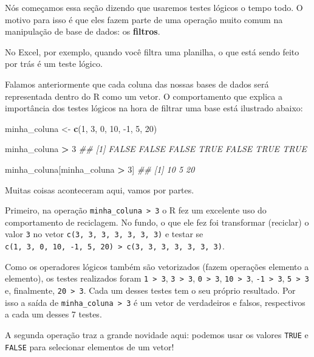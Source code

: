 \documentclass[]{book}
\newenvironment{Shaded}{\begin{snugshade}}{\end{snugshade}}
\newcommand{\CommentTok}[1]{\textcolor[rgb]{0.56,0.35,0.01}{\textit{#1}}}
\newcommand{\DecValTok}[1]{\textcolor[rgb]{0.00,0.00,0.81}{#1}}
\newcommand{\KeywordTok}[1]{\textcolor[rgb]{0.13,0.29,0.53}{\textbf{#1}}}
\newcommand{\NormalTok}[1]{#1}
\newcommand{\OperatorTok}[1]{\textcolor[rgb]{0.81,0.36,0.00}{\textbf{#1}}}
\newcommand{\StringTok}[1]{\textcolor[rgb]{0.31,0.60,0.02}{#1}}
\begin{document}
Nós começamos essa seção dizendo que usaremos testes lógicos o tempo todo. O motivo para isso é que eles fazem parte de uma operação muito comum na manipulação de base de dados: os \textbf{filtros}.

No Excel, por exemplo, quando você filtra uma planilha, o que está sendo feito por trás é um teste lógico.

Falamos anteriormente que cada coluna das nossas bases de dados será representada dentro do R como um vetor. O comportamento que explica a importância dos testes lógicos na hora de filtrar uma base está ilustrado abaixo:

\begin{Shaded}
\begin{Highlighting}[]
\NormalTok{minha_coluna <-}\StringTok{ }\KeywordTok{c}\NormalTok{(}\DecValTok{1}\NormalTok{, }\DecValTok{3}\NormalTok{, }\DecValTok{0}\NormalTok{, }\DecValTok{10}\NormalTok{, }\DecValTok{-1}\NormalTok{, }\DecValTok{5}\NormalTok{, }\DecValTok{20}\NormalTok{)}

\NormalTok{minha_coluna }\OperatorTok{>}\StringTok{ }\DecValTok{3}
\CommentTok{## [1] FALSE FALSE FALSE  TRUE FALSE  TRUE  TRUE}

\NormalTok{minha_coluna[minha_coluna }\OperatorTok{>}\StringTok{ }\DecValTok{3}\NormalTok{]}
\CommentTok{## [1] 10  5 20}
\end{Highlighting}
\end{Shaded}

Muitas coisas aconteceram aqui, vamos por partes.

Primeiro, na operação \texttt{minha\_coluna\ \textgreater{}\ 3} o R fez um excelente uso do comportamento de reciclagem. No fundo, o que ele fez foi transformar (reciclar) o valor \texttt{3} no vetor \texttt{c(3,\ 3,\ 3,\ 3,\ 3,\ 3,\ 3)} e testar se \texttt{c(1,\ 3,\ 0,\ 10,\ -1,\ 5,\ 20)\ \textgreater{}\ c(3,\ 3,\ 3,\ 3,\ 3,\ 3,\ 3)}.

Como os operadores lógicos também são vetorizados (fazem operações elemento a elemento), os testes realizados foram \texttt{1\ \textgreater{}\ 3}, \texttt{3\ \textgreater{}\ 3}, \texttt{0\ \textgreater{}\ 3}, \texttt{10\ \textgreater{}\ 3}, \texttt{-1\ \textgreater{}\ 3}, \texttt{5\ \textgreater{}\ 3} e, finalmente, \texttt{20\ \textgreater{}\ 3}. Cada um desses testes tem o seu próprio resultado. Por isso a saída de \texttt{minha\_coluna\ \textgreater{}\ 3} é um vetor de verdadeiros e falsos, respectivos a cada um desses 7 testes.

A segunda operação traz a grande novidade aqui: podemos usar os valores \texttt{TRUE} e \texttt{FALSE} para selecionar elementos de um vetor!
\end{document}
